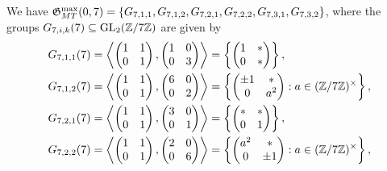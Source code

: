 We have $\mathfrak{G}_{MT}^{\max}(0,7) = \{ G_{7,1,1}, G_{7,1,2}, G_{7,2,1}, G_{7,2,2}, G_{7,3,1}, G_{7,3,2} \}$, where the groups $G_{7,i,k}(7) \subseteq \operatorname{GL}_2(\mathbb{Z}/7\mathbb{Z})$ are given by
\begin{equation*}
\begin{split}
G_{7,1,1}(7) &= \left\langle \begin{pmatrix} 1 & 1 \\ 0 & 1 \end{pmatrix}, \begin{pmatrix} 1 & 0 \\ 0 & 3 \end{pmatrix} \right\rangle = \left\{ \begin{pmatrix} 1 & * \\ 0 & * \end{pmatrix} \right\}, \\
G_{7,1,2}(7) &= \left\langle \begin{pmatrix} 1 & 1 \\ 0 & 1 \end{pmatrix}, \begin{pmatrix} 6 & 0 \\ 0 & 2 \end{pmatrix} \right\rangle = \left\{ \begin{pmatrix} \pm 1 & * \\ 0 & a^2 \end{pmatrix} : a \in (\mbz/7\mbz)^\times \right\}, \\
G_{7,2,1}(7) &= \left\langle \begin{pmatrix} 1 & 1 \\ 0 & 1 \end{pmatrix}, \begin{pmatrix} 3 & 0 \\ 0 & 1 \end{pmatrix} \right\rangle = \left\{ \begin{pmatrix} * & * \\ 0 & 1 \end{pmatrix} \right\}, \\
G_{7,2,2}(7) &= \left\langle \begin{pmatrix} 1 & 1 \\ 0 & 1 \end{pmatrix}, \begin{pmatrix} 2 & 0 \\ 0 & 6 \end{pmatrix} \right\rangle = \left\{ \begin{pmatrix} a^2 & * \\ 0 & \pm 1 \end{pmatrix} : a \in (\mbz/7\mbz)^\times \right\}, \\

\end{split}
\end{equation*}
